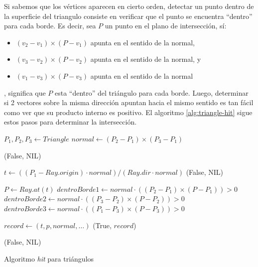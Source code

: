 Si sabemos que los vértices aparecen en cierto orden, detectar un punto dentro
de la superficie del triangulo consiste en verificar que el punto se encuentra
``dentro'' para cada borde. Es decir, sea $P$ un punto en el plano de
intersección, sí:

\begin{itemize}
  \item $(v_2 - v_1) \times (P - v_1)$ apunta en el sentido de la normal,
  \item $(v_3 - v_2) \times (P - v_2)$ apunta en el sentido de la normal, y
  \item $(v_1 - v_3) \times (P - v_3)$ apunta en el sentido de la normal
\end{itemize}

, significa que $P$ esta ``dentro'' del triángulo para cada borde. Luego,
determinar si 2 vectores sobre la misma dirección apuntan hacia el mismo sentido
es tan fácil como ver que su producto interno es positivo. El algoritmo
\ref{alg:triangle-hit} sigue estos pasos para determinar la intersección.

\begin{algorithm}
  \begin{algorithmic}[1]
    \State $P_1, P_2, P_3 \gets Triangle$ 
    \State $normal \gets (P_2 - P_1) \times (P_3 - P_1)$

    \State \Return (False, NIL) 
    \EndIf

    \State $t \gets ((P_1 - Ray.origin) \cdot normal) / (Ray.dir \cdot normal)$
    \State \Return (False, NIL)
    \EndIf

    \State $P \gets Ray.at(t)$ 
    \State $dentroBorde1 \gets normal \cdot ((P_2 - P_1) \times (P - P_1)) > 0$
    \State $dentroBorde2 \gets normal \cdot ((P_3 - P_2) \times (P - P_2)) > 0$
    \State $dentroBorde3 \gets normal \cdot ((P_1 - P_3) \times (P - P_3)) > 0$


    \State $record \gets (t, p, normal, \dots)$
    \State \Return (True, $record$)
    \EndIf

    \State \Return (False, NIL)
    \EndFunction
  \end{algorithmic}
  \caption{Algoritmo \textit{hit} para triángulos}
  \label{alg:triangle-hit}
\end{algorithm}

